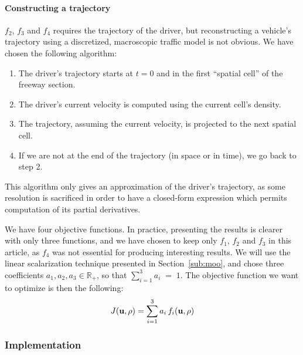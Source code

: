 \paragraph{Constructing a trajectory}
$f_2$, $f_3$ and $f_4$ requires the trajectory of the driver, but reconstructing a vehicle's trajectory using a discretized, macroscopic traffic model is not obvious. We have chosen the following algorithm:
\begin{enumerate}
\item The driver's trajectory starts at $t = 0$ and in the first ``spatial cell'' of the freeway section.
\item The driver's current velocity is computed using the current cell's density.
\item The trajectory, assuming the current velocity, is projected to the next spatial cell.
\item If we are not at the end of the trajectory (in space or in time), we go back to step 2.
\end{enumerate}

This algorithm only gives an approximation of the driver's trajectory, as some resolution is sacrificed in order to have a closed-form expression which permits computation of its partial derivatives.


We have four objective functions. In practice, presenting the results is clearer with only three functions, and we have chosen to keep only $f_1$, $f_2$ and $f_3$ in this article, as $f_4$ was not essential for producing interesting results. We will use the linear scalarization technique presented in Section~\ref{sub:moo}, and chose three coefficients $a_1, a_2, a_3 \in \mathbb{R}_+$, so that $\sum_{i=1}^3 a_i \; = \; 1$. The objective function we want to optimize is then the following:
\begin{equation}
J \left( \vectorize{u}, \vectorize{\rho} \right) = \sum_{i=1}^3 a_i \, f_i \left( \vectorize{u}, \vectorize{\rho} \right)	
\end{equation}

\subsubsection{Implementation}
